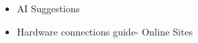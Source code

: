 \begin{itemize}
    \item AI Suggestions
    \item Hardware connections guide- Online Sites
\end{itemize}